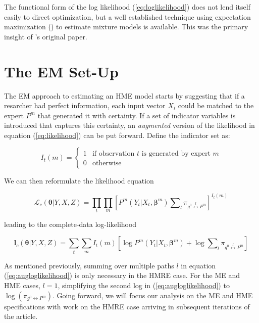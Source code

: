 \documentclass[12pt]{article}
\newcommand{\gateprod}[2]{\pi_{#1 \longleftrightarrow #2}}
\newcommand{\sumgateprod}[3]{\pi_{#1 \overset{#3}{\longleftrightarrow} #2}}
\newcommand{\shortsum}[1]{\sum \nolimits_{#1}}
\begin{document}
The functional form of the log likelihood (\ref{eq:loglikelihood}) does not
lend itself easily to direct optimization, but a well established
technique using expectation maximization (\cite{EM_DLR1977}) to estimate mixture
models is available. This was the primary insight of \cite{JordanJacobs1993}'s
original paper.


\section{The EM Set-Up} \label{sec:Estimation}

The EM approach to estimating an HME model starts by suggesting that if a
resarcher had perfect information, each input vector $X_{t}$ could be matched
to the expert $P^{m}$ that generated it with certainty. If a set of indicator
variables is introduced that captures this certainty, an \textit{augmented}
version of the likelihood in equation (\ref{eq:likelihood}) can be put forward.
Define the indicator set as:

\begin{equation} \label{eq:indicator}
  I_{t}(m) = \begin{cases} 
     1 & \textrm{if observation $t$ is generated by expert $m$} \\
     0 & \textrm{otherwise}
             \end{cases}
\end{equation}

We can then reformulate the likelihood equation

\begin{equation}  \label{eq:auglikelihood}
  \mathcal{L}_{c}(\boldsymbol{\theta}|Y, X, Z) = \prod_{t} \prod_{m} \left[ P^{m}(Y_{t}|X_{t}, \boldsymbol{\beta}^{m}) \shortsum{l} \sumgateprod{g^{0}}{P^{m}}{l} \right]^{I_{t}(m)}
\end{equation}

leading to the complete-data log-likelihood

\begin{equation}  \label{eq:augloglikelihood}
  \boldsymbol{l}_{c}(\boldsymbol{\theta}|Y, X, Z) = \sum_{t} \sum_{m} I_{t}(m) \left[\log P^{m}(Y_{t}|X_{t}, \boldsymbol{\beta}^{m}) + \log \shortsum{l} \sumgateprod{g^{0}}{P^{m}}{l} \right]
\end{equation}

As mentioned previously, summing over multiple paths $l$ in equation
(\ref{eq:augloglikelihood}) is only necessary in the HMRE case. For the ME
and HME cases, $l = 1$, simplifying the second log in (\ref{eq:augloglikelihood})
to $\log(\gateprod{g^{0}}{P^{m}})$. Going forward, we will focus our analysis on
the ME and HME specifications with work on the HMRE case arriving in subsequent
iterations of the article.
\end{document}
